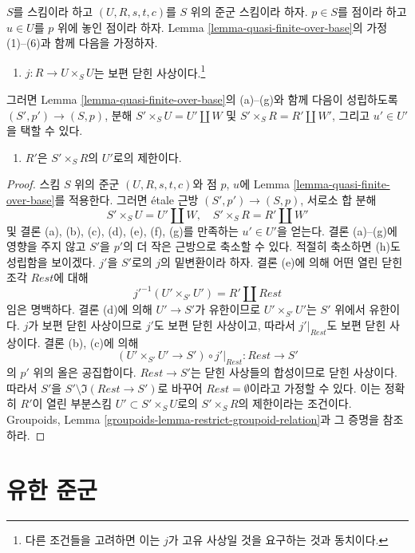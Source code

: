 \begin{lemma}
\label{lemma-quasi-finite-over-base-j-proper}
$S$를 스킴이라 하고 $(U, R, s, t, c)$를 $S$ 위의 준군 스킴이라 하자.
$p \in S$를 점이라 하고 $u \in U$를 $p$ 위에 놓인 점이라 하자.
Lemma \ref{lemma-quasi-finite-over-base}의 가정 (1)--(6)과 함께 다음을
가정하자.
\begin{enumerate}
\item[(7)] $j : R \to U \times_S U$는 보편 닫힌 사상이다.\footnote{다른
조건들을 고려하면 이는 $j$가 고유 사상일 것을 요구하는 것과 동치이다.}
\end{enumerate}
그러면 Lemma \ref{lemma-quasi-finite-over-base}의 (a)--(g)와 함께 다음이
성립하도록 $(S', p') \to (S, p)$, 분해
$S' \times_S U = U' \amalg W$ 및 $S' \times_S R = R' \amalg W'$, 그리고
$u' \in U'$을 택할 수 있다.
\begin{enumerate}
\item[(h)] $R'$은 $S' \times_S R$의 $U'$로의 제한이다.
\end{enumerate}
\end{lemma}

\begin{proof}
스킴 $S$ 위의 준군 $(U, R, s, t, c)$와 점 $p$, $u$에 Lemma
\ref{lemma-quasi-finite-over-base}를 적용한다. 그러면 \'etale 근방
$(S', p') \to (S, p)$, 서로소 합 분해
$$
S' \times_S U = U' \amalg W, \quad
S' \times_S R = R' \amalg W'
$$
및 결론 (a), (b), (c), (d), (e), (f), (g)를 만족하는 $u' \in U'$을 얻는다.
결론 (a)--(g)에 영향을 주지 않고 $S'$을 $p'$의 더 작은 근방으로 축소할 수
있다. 적절히 축소하면 (h)도 성립함을 보이겠다. $j'$을 $S'$로의 $j$의
밑변환이라 하자. 결론 (e)에 의해 어떤 열린 닫힌 조각 $Rest$에 대해
$$
j'^{-1}(U' \times_{S'} U') = R' \amalg Rest
$$
임은 명백하다. 결론 (d)에 의해 $U' \to S'$가 유한이므로
$U' \times_{S'} U'$는 $S'$ 위에서 유한이다. $j$가 보편 닫힌 사상이므로
$j'$도 보편 닫힌 사상이고, 따라서 $j'|_{Rest}$도 보편 닫힌 사상이다.
결론 (b), (c)에 의해
$$
(U' \times_{S'} U' \to S') \circ j'|_{Rest} :
Rest
\longrightarrow
S'
$$
의 $p'$ 위의 올은 공집합이다. $Rest \to S'$는 닫힌 사상들의 합성이므로
닫힌 사상이다. 따라서 $S'$을 $S' \setminus \Im(Rest \to S')$로 바꾸어
$Rest = \emptyset$이라고 가정할 수 있다. 이는 정확히 $R'$이 열린 부분스킴
$U' \subset S' \times_S U$로의 $S' \times_S R$의 제한이라는 조건이다.
Groupoids, Lemma \ref{groupoids-lemma-restrict-groupoid-relation}과 그 증명을
참조하라.
\end{proof}






\section{유한 준군}
\label{section-finite-groupoids}

